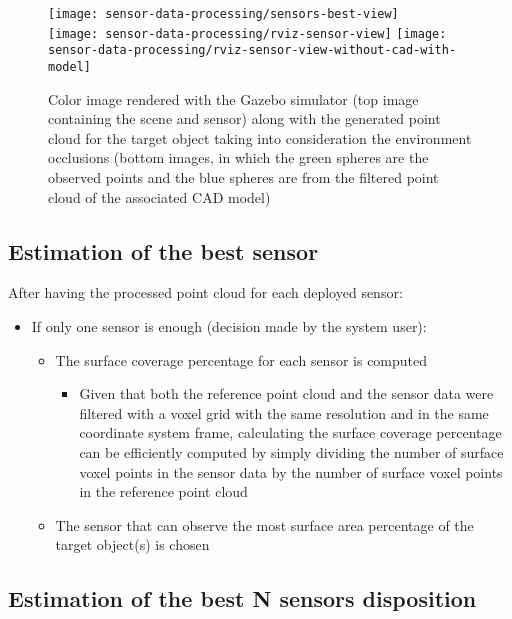 \begin{figure}
	\centering
	\texttt{[image: sensor-data-processing/sensors-best-view]}\\
	\vspace{0.5em}
	\texttt{[image: sensor-data-processing/rviz-sensor-view]}\hspace{2em}
	\texttt{[image: sensor-data-processing/rviz-sensor-view-without-cad-with-model]}
	\caption{Color image rendered with the Gazebo simulator (top image containing the scene and sensor) along with the generated point cloud for the target object taking into consideration the environment occlusions (bottom images, in which the green spheres are the observed points and the blue spheres are from the filtered point cloud of the associated CAD model)}
\end{figure}


\subsection{Estimation of the best sensor}

After having the processed point cloud for each deployed sensor:
\begin{itemize}
	\item If only one sensor is enough (decision made by the system user):
	\begin{itemize}
		\item The surface coverage percentage for each sensor is computed
		\begin{itemize}
			\item Given that both the reference point cloud and the sensor data were filtered with a voxel grid with the same resolution and in the same coordinate system frame, calculating the surface coverage percentage can be efficiently computed by simply dividing the number of surface voxel points in the sensor data by the number of surface voxel points in the reference point cloud
		\end{itemize}
			\item The sensor that can observe the most surface area percentage of the target object(s) is chosen
	\end{itemize}
\end{itemize}


\subsection{Estimation of the best N sensors disposition}


